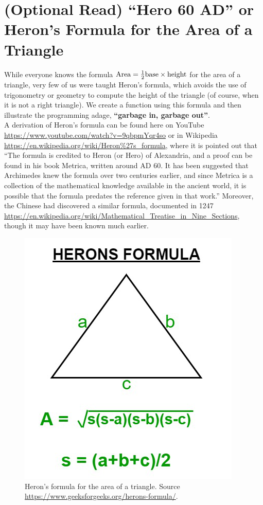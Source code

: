



\section{(Optional Read) ``Hero 60 AD'' or Heron's Formula for the Area of a Triangle}


While everyone knows the formula ${\rm Area} = \frac{1}{2} {\rm base} \times {\rm height}$ for the area of a triangle, very few of us were taught Heron's formula, which avoids the use of trigonometry or geometry to compute the height of the triangle (of course, when it is not a right triangle). We create a function using this formula and then illustrate the programming adage, \textbf{``garbage in, garbage out''}. \\

A derivation of Heron's formula can be found here on YouTube \url{https://www.youtube.com/watch?v=9qbpmYqr4so} or in Wikipedia \url{https://en.wikipedia.org/wiki/Heron\%27s_formula}, where it is pointed out that ``The formula is credited to Heron (or Hero) of Alexandria, and a proof can be found in his book Metrica, written around AD 60. It has been suggested that Archimedes knew the formula over two centuries earlier, and since Metrica is a collection of the mathematical knowledge available in the ancient world, it is possible that the formula predates the reference given in that work.'' Moreover, the Chinese had discovered a similar formula, documented in 1247 \url{https://en.wikipedia.org/wiki/Mathematical_Treatise_in_Nine_Sections}, though it may have been known much earlier.


\begin{figure}[htb!]%
\centering
\includegraphics[width=0.31\columnwidth]{graphics/Chap04/heron.jpg}%
\caption[]{Heron's formula for the area of a triangle. Source  \url{https://www.geeksforgeeks.org/herons-formula/}.}
    \label{columneron}
\end{figure}

